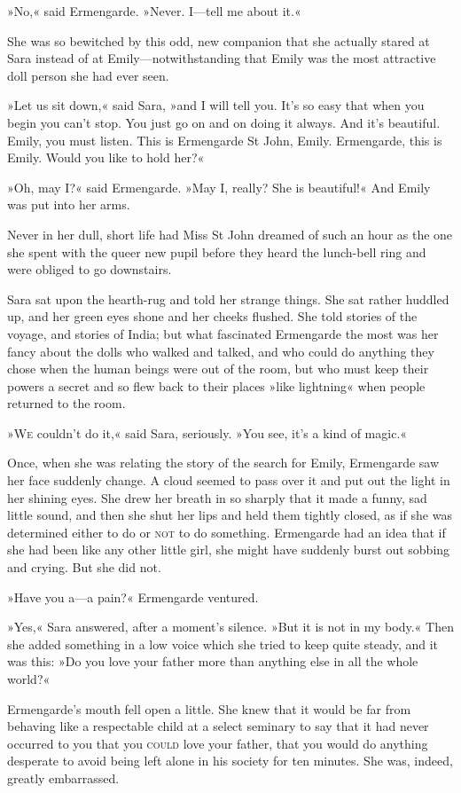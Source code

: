 »No,« said Ermengarde. »Never. I—tell me about it.«

She was so bewitched by this odd, new companion that she actually stared at Sara instead of at Emily—notwithstanding that Emily was the most attractive doll person she had ever seen.

»Let us sit down,« said Sara, »and I will tell you. It's so easy that when you begin you can't stop. You just go on and on doing it always. And it's beautiful. Emily, you must listen. This is Ermengarde St John, Emily. Ermengarde, this is Emily. Would you like to hold her?«

»Oh, may I?« said Ermengarde. »May I, really? She is beautiful!« And Emily was put into her arms.

Never in her dull, short life had Miss St John dreamed of such an hour as the one she spent with the queer new pupil before they heard the lunch-bell ring and were obliged to go downstairs.

Sara sat upon the hearth-rug and told her strange things. She sat rather huddled up, and her green eyes shone and her cheeks flushed. She told stories of the voyage, and stories of India; but what fascinated Ermengarde the most was her fancy about the dolls who walked and talked, and who could do anything they chose when the human beings were out of the room, but who must keep their powers a secret and so flew back to their places »like lightning« when people returned to the room.

»\textsc{We} couldn't do it,« said Sara, seriously. »You see, it's a kind of magic.«

Once, when she was relating the story of the search for Emily, Ermengarde saw her face suddenly change. A cloud seemed to pass over it and put out the light in her shining eyes. She drew her breath in so sharply that it made a funny, sad little sound, and then she shut her lips and held them tightly closed, as if she was determined either to do or \textsc{not} to do something. Ermengarde had an idea that if she had been like any other little girl, she might have suddenly burst out sobbing and crying. But she did not.

»Have you a—a pain?« Ermengarde ventured.

»Yes,« Sara answered, after a moment's silence. »But it is not in my body.« Then she added something in a low voice which she tried to keep quite steady, and it was this: »Do you love your father more than anything else in all the whole world?«

Ermengarde's mouth fell open a little. She knew that it would be far from behaving like a respectable child at a select seminary to say that it had never occurred to you that you \textsc{could} love your father, that you would do anything desperate to avoid being left alone in his society for ten minutes. She was, indeed, greatly embarrassed.

